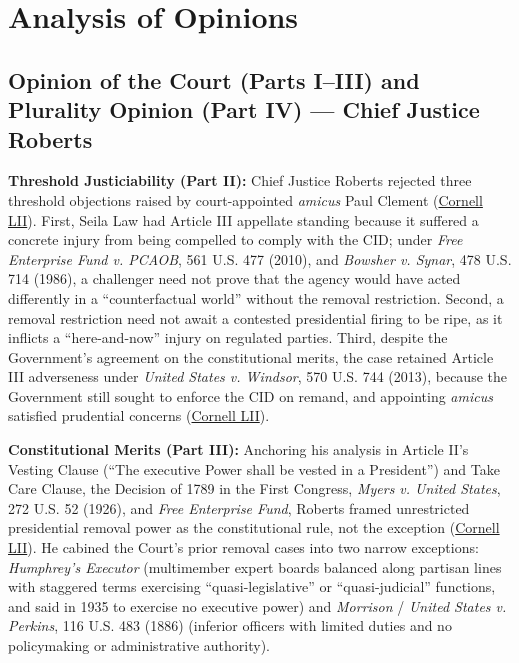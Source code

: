 \documentclass[12pt]{article}
\begin{document}
\section{Analysis of Opinions}

\subsection{Opinion of the Court (Parts I--III) and Plurality Opinion (Part IV) --- Chief Justice Roberts}

\textbf{Threshold Justiciability (Part II):} Chief Justice Roberts rejected three threshold objections raised by court-appointed \textit{amicus} Paul Clement (\href{https://www.law.cornell.edu/supremecourt/text/19-7}{Cornell LII}). First, Seila Law had Article III appellate standing because it suffered a concrete injury from being compelled to comply with the CID; under \textit{Free Enterprise Fund v. PCAOB}, 561 U.S. 477 (2010), and \textit{Bowsher v. Synar}, 478 U.S. 714 (1986), a challenger need not prove that the agency would have acted differently in a ``counterfactual world'' without the removal restriction. Second, a removal restriction need not await a contested presidential firing to be ripe, as it inflicts a ``here-and-now'' injury on regulated parties. Third, despite the Government's agreement on the constitutional merits, the case retained Article III adverseness under \textit{United States v. Windsor}, 570 U.S. 744 (2013), because the Government still sought to enforce the CID on remand, and appointing \textit{amicus} satisfied prudential concerns (\href{https://www.law.cornell.edu/supremecourt/text/19-7}{Cornell LII}).

\textbf{Constitutional Merits (Part III):} Anchoring his analysis in Article II's Vesting Clause (``The executive Power shall be vested in a President'') and Take Care Clause, the Decision of 1789 in the First Congress, \textit{Myers v. United States}, 272 U.S. 52 (1926), and \textit{Free Enterprise Fund}, Roberts framed unrestricted presidential removal power as the constitutional rule, not the exception (\href{https://www.law.cornell.edu/supremecourt/text/19-7}{Cornell LII}). He cabined the Court's prior removal cases into two narrow exceptions: \textit{Humphrey's Executor} (multimember expert boards balanced along partisan lines with staggered terms exercising ``quasi-legislative'' or ``quasi-judicial'' functions, and said in 1935 to exercise no executive power) and \textit{Morrison} / \textit{United States v. Perkins}, 116 U.S. 483 (1886) (inferior officers with limited duties and no policymaking or administrative authority).
\end{document}
